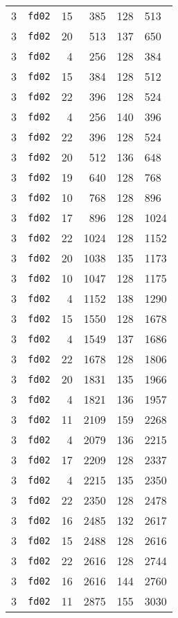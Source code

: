 \documentclass{article}
\begin{document}
\begin{table}[h!]
\begin{tabular}{llrrrl}
    3 & \texttt{fd02} & 15 & 385 & 128 & 513 \\
    3 & \texttt{fd02} & 20 & 513 & 137 & 650 \\
    3 & \texttt{fd02} & 4 & 256 & 128 & 384 \\
    3 & \texttt{fd02} & 15 & 384 & 128 & 512 \\
    3 & \texttt{fd02} & 22 & 396 & 128 & 524 \\
    3 & \texttt{fd02} & 4 & 256 & 140 & 396 \\
    3 & \texttt{fd02} & 22 & 396 & 128 & 524 \\
    3 & \texttt{fd02} & 20 & 512 & 136 & 648 \\
    3 & \texttt{fd02} & 19 & 640 & 128 & 768 \\
    3 & \texttt{fd02} & 10 & 768 & 128 & 896 \\
    3 & \texttt{fd02} & 17 & 896 & 128 & 1024 \\
    3 & \texttt{fd02} & 22 & 1024 & 128 & 1152 \\
    3 & \texttt{fd02} & 20 & 1038 & 135 & 1173 \\
    3 & \texttt{fd02} & 10 & 1047 & 128 & 1175 \\
    3 & \texttt{fd02} & 4 & 1152 & 138 & 1290 \\
    3 & \texttt{fd02} & 15 & 1550 & 128 & 1678 \\
    3 & \texttt{fd02} & 4 & 1549 & 137 & 1686 \\
    3 & \texttt{fd02} & 22 & 1678 & 128 & 1806 \\
    3 & \texttt{fd02} & 20 & 1831 & 135 & 1966 \\
    3 & \texttt{fd02} & 4 & 1821 & 136 & 1957 \\
    3 & \texttt{fd02} & 11 & 2109 & 159 & 2268 \\
    3 & \texttt{fd02} & 4 & 2079 & 136 & 2215 \\
    3 & \texttt{fd02} & 17 & 2209 & 128 & 2337 \\
    3 & \texttt{fd02} & 4 & 2215 & 135 & 2350 \\
    3 & \texttt{fd02} & 22 & 2350 & 128 & 2478 \\
    3 & \texttt{fd02} & 16 & 2485 & 132 & 2617 \\
    3 & \texttt{fd02} & 15 & 2488 & 128 & 2616 \\
    3 & \texttt{fd02} & 22 & 2616 & 128 & 2744 \\
    3 & \texttt{fd02} & 16 & 2616 & 144 & 2760 \\
    3 & \texttt{fd02} & 11 & 2875 & 155 & 3030 \\

\end{tabular}
\end{table}
\end{document}
